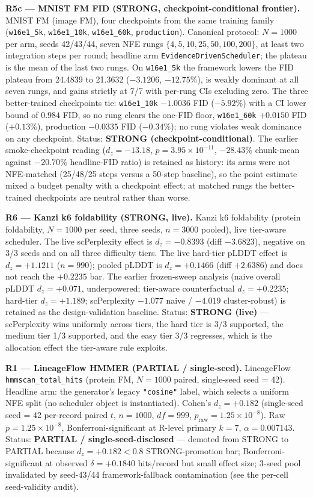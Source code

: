\documentclass[journal,twocolumn,final]{IEEEtran}
\begin{document}
\textbf{R5c --- MNIST FM FID (STRONG, checkpoint-conditional frontier).} MNIST FM (image FM), four checkpoints from the same training family (\texttt{w16e1\_5k}, \texttt{w16e1\_10k}, \texttt{w16e1\_60k}, \texttt{production}). Canonical protocol: $N=1000$ per arm, seeds 42/43/44, seven NFE rungs $\{4,5,10,25,50,100,200\}$, at least two integration steps per round; headline arm \texttt{EvidenceDrivenScheduler}; the plateau is the mean of the last two rungs. On \texttt{w16e1\_5k} the framework lowers the FID plateau from 24.4839 to 21.3632 ($-3.1206$, $-12.75\%$), is weakly dominant at all seven rungs, and gains strictly at 7/7 with per-rung CIs excluding zero. The three better-trained checkpoints tie: \texttt{w16e1\_10k} $-1.0036$ FID ($-5.92\%$) with a CI lower bound of $0.984$ FID, so no rung clears the one-FID floor, \texttt{w16e1\_60k} $+0.0150$ FID ($+0.13\%$), production $-0.0335$ FID ($-0.34\%$); no rung violates weak dominance on any checkpoint. Status: \textbf{STRONG (checkpoint-conditional)}. The earlier smoke-checkpoint reading ($d_z=-13.18$, $p=3.95\times10^{-11}$, $-28.43\%$ chunk-mean against $-20.70\%$ headline-FID ratio) is retained as history: its arms were not NFE-matched (25/48/25 steps versus a 50-step baseline), so the point estimate mixed a budget penalty with a checkpoint effect; at matched rungs the better-trained checkpoints are neutral rather than worse.

\textbf{R6 --- Kanzi k6 foldability (STRONG, live).} Kanzi k6 foldability (protein foldability, $N=1000$ per seed, three seeds, $n=3000$ pooled), live tier-aware scheduler. The live scPerplexity effect is $d_z=-0.8393$ (diff $-3.6823$), negative on 3/3 seeds and on all three difficulty tiers. The live hard-tier pLDDT effect is $d_z=+1.1211$ ($n=990$); pooled pLDDT is $d_z=+0.1466$ (diff $+2.6386$) and does not reach the $+0.2235$ bar. The earlier frozen-sweep analysis (naive overall pLDDT $d_z=+0.071$, underpowered; tier-aware counterfactual $d_z=+0.2235$; hard-tier $d_z=+1.189$; scPerplexity $-1.077$ naive / $-4.019$ cluster-robust) is retained as the design-validation baseline. Status: \textbf{STRONG (live)} --- scPerplexity wins uniformly across tiers, the hard tier is 3/3 supported, the medium tier 1/3 supported, and the easy tier 3/3 regresses, which is the allocation effect the tier-aware rule exploits.

\textbf{R1 --- LineageFlow HMMER (PARTIAL / single-seed).} LineageFlow \texttt{hmmscan\_total\_hits} (protein FM, $N = 1000$ paired, single-seed seed = 42). Headline arm: the generator's legacy \texttt{"cosine"} label, which selects a uniform NFE split (no scheduler object is instantiated). Cohen's $d_z = +0.182$ (single-seed seed = 42 per-record paired $t$, $n = 1000$, $df = 999$, $p_\text{raw} = 1.25 \times 10^{-8}$). Raw $p = 1.25 \times 10^{-8}$, Bonferroni-significant at R-level primary $k = 7$, $\alpha = 0.007143$. Status: \textbf{PARTIAL / single-seed-disclosed} --- demoted from STRONG to PARTIAL because $d_z = +0.182 < 0.8$ STRONG-promotion bar; Bonferroni-significant at observed $\delta = +0.1840$ hits/record but small effect size; 3-seed pool invalidated by seed-43/44 framework-fallback contamination (see the per-cell seed-validity audit).
\end{document}
